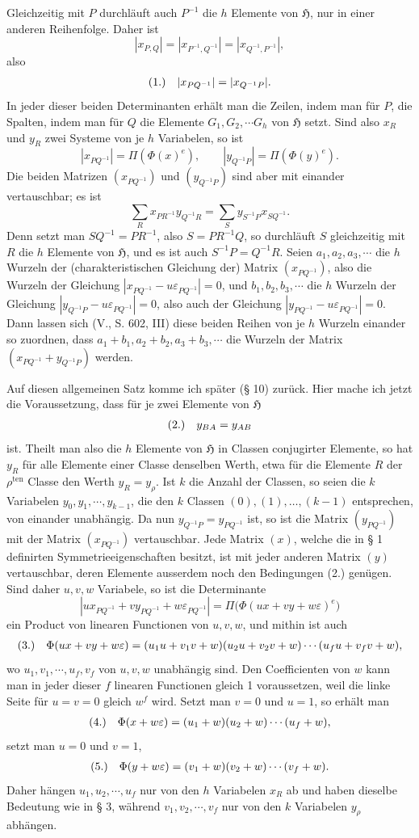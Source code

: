 \documentclass[11pt]{article}
\makeatletter
\newcommand{\Hgrp}{\mathfrak{H}}
\newcommand{\frobtagc}[2]{\[\begin{array}{@{}r@{\quad}c@{}}\textup{(#1)} & \displaystyle #2\end{array}\]}
\makeatother
\begin{document}
Gleichzeitig mit $P$ durchläuft auch $P^{-1}$ die $h$ Elemente von $\Hgrp$, nur in einer anderen Reihenfolge. Daher ist
\[
|x_{P,Q}|=|x_{P^{-1},Q^{-1}}|=|x_{Q^{-1},P^{-1}}|,
\]
also
\frobtagc{1.}{|x_{PQ^{-1}}|=|x_{Q^{-1}P}|.}
In jeder dieser beiden Determinanten erhält man die Zeilen, indem man für $P$, die Spalten, indem man für $Q$ die Elemente $G_1,G_2,\cdots G_h$ von $\Hgrp$ setzt. Sind also $x_R$ und $y_R$ zwei Systeme von je $h$ Variabelen, so ist
\[
|x_{PQ^{-1}}|=\Pi(\Phi(x)^e),\qquad |y_{Q^{-1}P}|=\Pi(\Phi(y)^e).
\]
Die beiden Matrizen $(x_{PQ^{-1}})$ und $(y_{Q^{-1}P})$ sind aber mit einander vertauschbar; es ist
\[
\sum_R x_{PR^{-1}}y_{Q^{-1}R}=\sum_S y_{S^{-1}P}x_{SQ^{-1}}.
\]
Denn setzt man $SQ^{-1}=PR^{-1}$, also $S=PR^{-1}Q$, so durchläuft $S$ gleichzeitig mit $R$ die $h$ Elemente von $\Hgrp$, und es ist auch $S^{-1}P=Q^{-1}R$. Seien $a_1,a_2,a_3,\cdots$ die $h$ Wurzeln der (charakteristischen Gleichung der) Matrix $(x_{PQ^{-1}})$, also die Wurzeln der Gleichung $|x_{PQ^{-1}}-u\varepsilon_{PQ^{-1}}|=0$, und $b_1,b_2,b_3,\cdots$ die $h$ Wurzeln der Gleichung $|y_{Q^{-1}P}-u\varepsilon_{PQ^{-1}}|=0$, also auch der Gleichung $|y_{PQ^{-1}}-u\varepsilon_{PQ^{-1}}|=0$. Dann lassen sich (V., S. 602, III) diese beiden Reihen von je $h$ Wurzeln einander so zuordnen, dass $a_1+b_1,a_2+b_2,a_3+b_3,\cdots$ die Wurzeln der Matrix $(x_{PQ^{-1}}+y_{Q^{-1}P})$ werden.

Auf diesen allgemeinen Satz komme ich später (§ 10) zurück. Hier mache ich jetzt die Voraussetzung, dass für je zwei Elemente von $\Hgrp$
\frobtagc{2.}{y_{BA}=y_{AB}}
ist. Theilt man also die $h$ Elemente von $\Hgrp$ in Classen conjugirter Elemente, so hat $y_R$ für alle Elemente einer Classe denselben Werth, etwa für die Elemente $R$ der $\rho^{\mathrm{ten}}$ Classe den Werth $y_R=y_\rho$. Ist $k$ die Anzahl der Classen, so seien die $k$ Variabelen $y_0,y_1,\cdots,y_{k-1}$, die den $k$ Classen $(0),(1),\ldots,(k-1)$ entsprechen, von einander unabhängig. Da nun $y_{Q^{-1}P}=y_{PQ^{-1}}$ ist, so ist die Matrix $(y_{PQ^{-1}})$ mit der Matrix $(x_{PQ^{-1}})$ vertauschbar. Jede Matrix $(x)$, welche die in § 1 definirten Symmetrieeigenschaften besitzt, ist mit jeder anderen Matrix $(y)$ vertauschbar, deren Elemente ausserdem noch den Bedingungen (2.) genügen. Sind daher $u,v,w$ Variabele, so ist die Determinante
\[
|ux_{PQ^{-1}}+vy_{PQ^{-1}}+w\varepsilon_{PQ^{-1}}|=\Pi\bigl(\Phi(ux+vy+w\varepsilon)^e\bigr)
\]
ein Product von linearen Functionen von $u,v,w$, und mithin ist auch
\frobtagc{3.}{\Phi(ux+vy+w\varepsilon)=(u_1u+v_1v+w)(u_2u+v_2v+w)\cdots(u_fu+v_fv+w),}
wo $u_1,v_1,\cdots,u_f,v_f$ von $u,v,w$ unabhängig sind. Den Coefficienten von $w$ kann man in jeder dieser $f$ linearen Functionen gleich 1 voraussetzen, weil die linke Seite für $u=v=0$ gleich $w^f$ wird. Setzt man $v=0$ und $u=1$, so erhält man
\frobtagc{4.}{\Phi(x+w\varepsilon)=(u_1+w)(u_2+w)\cdots(u_f+w),}
setzt man $u=0$ und $v=1$,
\frobtagc{5.}{\Phi(y+w\varepsilon)=(v_1+w)(v_2+w)\cdots(v_f+w).}
Daher hängen $u_1,u_2,\cdots,u_f$ nur von den $h$ Variabelen $x_R$ ab und haben dieselbe Bedeutung wie in § 3, während $v_1,v_2,\cdots,v_f$ nur von den $k$ Variabelen $y_\rho$ abhängen.
\end{document}
